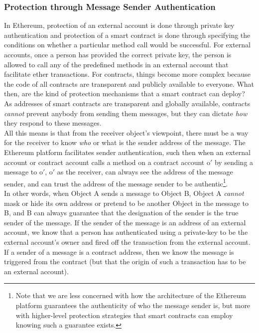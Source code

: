 \documentclass[a4paper,11pt,twoside]{article}
\begin{document}
{\subsubsection{Protection through Message Sender Authentication}
In Ethereum, protection of an external account is done through private key authentication and protection of a smart contract is done through specifying the conditions on whether a particular method call would be successful. For external accounts, once a person has provided the correct private key, the person is allowed to call any of the predefined methods in an external account that facilitate ether transactions. For contracts, things become more complex because the code of all contracts are transparent and publicly available to everyone. What then, are the kind of protection mechanisms that a smart contract can deploy? As addresses of smart contracts are transparent and globally available, contracts \textit{cannot} prevent anybody from sending them messages, but they can dictate \textit{how} they respond to these messages.\\

All this means is that from the receiver object's viewpoint, there must be a way for the receiver to know \textit{who} or what is the sender address of the message. The Ethereum platform facilitates sender authentication, such then when an external account or contract account calls a method on a contract account o$'$ by sending a message to o$'$, o$'$ as the receiver, can always see the address of the message sender, and can trust the address of the message sender to be authentic\footnote{Note that we are less concerned with how the architecture of the Ethereum platform guarantees the authenticity of who the message sender is, but more with higher-level protection strategies that smart contracts can employ knowing such a guarantee exists.}.\\

In other words, when Object A sends a message to Object B, Object A \textit{cannot} mask or hide its own address or pretend to be another Object in the message to B, and B can always guarantee that the designation of the sender is the true sender of the message. If the sender of the message is an address of an external account, we know that a person has authenticated using a private-key to be the external account's owner and fired off the transaction from the external account. If a sender of a message is a contract address, then we know the message is triggered from the contract (but that the origin of such a transaction has to be an external account).\\

}
\end{document}
